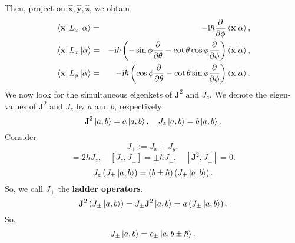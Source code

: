 \documentclass{article}
\theoremstyle{1}
\newcommand{\ii}{\mathrm{i}}
\begin{document}
Then, project on $\hat{\mathbf{x}},\hat{\mathbf{y}},\hat{\mathbf{z}}$, we obtain
\begin{eqnarray}
    &\bra{\mathbf{x}}L_z\ket{\alpha}=&-\ii \hbar \pdv{\phi}\braket{\mathbf{x}}{\alpha},\\
    &\bra{\mathbf{x}}L_x\ket{\alpha}=&-\ii \hbar \left(-\sin \phi \pdv{\theta}-\cot\theta\cos\phi \pdv{\phi}\right)\braket{\mathbf{x}}{\alpha},\\
    &\bra{\mathbf{x}}L_y\ket{\alpha}=&-\ii \hbar \left(\cos \phi \pdv{\theta}-\cot\theta\sin\phi \pdv{\phi}\right)\braket{\mathbf{x}}{\alpha}.
\end{eqnarray}
We now look for the simultaneous eigenkets of $\mathbf{J}^2$ and $J_z$. We denote the eigen-values of $\mathbf{J}^2$ and $J_z$ by $a$ and $b$, respectively:
\begin{equation}
    \mathbf{J}^2\ket{a,b}=a\ket{a,b},\quad J_z\ket{a,b}=b\ket{a,b}.
\end{equation}
Consider
\begin{equation}
    J_\pm:=J_x\pm J_y,
\end{equation}
\begin{equation}
    [J_+,J_-]=2\hbar J_z,\quad [J_z,J_\pm]=\pm\hbar J_\pm,\quad [\mathbf{J}^2,J_\pm]=0.
\end{equation}
\begin{equation}
    J_z\left(J_\pm\ket{a,b}\right)=\left(b\pm\hbar\right)\left( J_\pm\ket{a,b}\right).
\end{equation}
So, we call $J_\pm$ the \textbf{ladder operators}.
\begin{equation}
    \mathbf{J}^2\left(J_\pm\ket{a,b}\right)=J_\pm \mathbf{J}^2\ket{a,b}=a\left(J_\pm\ket{a,b}\right).
\end{equation}
So, 
\begin{equation}
    J_\pm\ket{a,b}=c_\pm\ket{a,b\pm \hbar}.
\end{equation}
\end{document}
